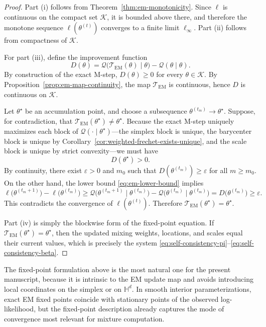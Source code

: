 \documentclass[11pt]{article}
\begin{document}
\begin{proof}
Part (i) follows from Theorem~\ref{thm:em-monotonicity}. Since \(\ell\) is continuous on the compact set \(\mathcal{K}\), it is bounded above there, and therefore the monotone sequence \(\ell(\theta^{(t)})\) converges to a finite limit \(\ell_\infty\). Part (ii) follows from compactness of \(\mathcal{K}\).

For part (iii), define the improvement function
\[
D(\theta)
=
\mathcal{Q}\bigl(\mathcal{T}_{\mathrm{EM}}(\theta)\mid\theta\bigr)
-
\mathcal{Q}(\theta\mid\theta).
\]
By construction of the exact M-step, \(D(\theta)\ge 0\) for every \(\theta\in\mathcal{K}\). By Proposition~\ref{prop:em-map-continuity}, the map \(\mathcal{T}_{\mathrm{EM}}\) is continuous, hence \(D\) is continuous on \(\mathcal{K}\).

Let \(\theta^\star\) be an accumulation point, and choose a subsequence \(\theta^{(t_m)}\to\theta^\star\). Suppose, for contradiction, that \(\mathcal{T}_{\mathrm{EM}}(\theta^\star)\neq \theta^\star\). Because the exact M-step uniquely maximizes each block of \(\mathcal{Q}(\cdot\mid\theta^\star)\)---the simplex block is unique, the barycenter block is unique by Corollary~\ref{cor:weighted-frechet-exists-unique}, and the scale block is unique by strict convexity---we must have
\[
D(\theta^\star)>0.
\]
By continuity, there exist \(\varepsilon>0\) and \(m_0\) such that \(D(\theta^{(t_m)})\ge \varepsilon\) for all \(m\ge m_0\). On the other hand, the lower bound \eqref{eq:em-lower-bound} implies
\[
\ell\bigl(\theta^{(t_m+1)}\bigr)-\ell\bigl(\theta^{(t_m)}\bigr)
\ge
\mathcal{Q}\bigl(\theta^{(t_m+1)}\mid\theta^{(t_m)}\bigr)
-
\mathcal{Q}\bigl(\theta^{(t_m)}\mid\theta^{(t_m)}\bigr)
=
D\bigl(\theta^{(t_m)}\bigr)
\ge
\varepsilon.
\]
This contradicts the convergence of \(\ell(\theta^{(t)})\). Therefore \(\mathcal{T}_{\mathrm{EM}}(\theta^\star)=\theta^\star\).

Part (iv) is simply the blockwise form of the fixed-point equation. If \(\mathcal{T}_{\mathrm{EM}}(\theta^\star)=\theta^\star\), then the updated mixing weights, locations, and scales equal their current values, which is precisely the system \eqref{eq:self-consistency-pi}--\eqref{eq:self-consistency-beta}.
\end{proof}

The fixed-point formulation above is the most natural one for the present manuscript, because it is intrinsic to the EM update map and avoids introducing local coordinates on the simplex or on \(\mathbb{H}^d\). In smooth interior parameterizations, exact EM fixed points coincide with stationary points of the observed log-likelihood, but the fixed-point description already captures the mode of convergence most relevant for mixture computation.
\end{document}

